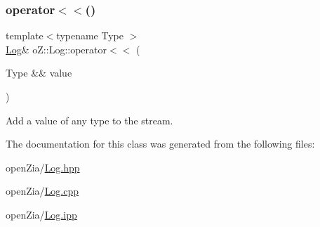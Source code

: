 \mbox{\label{classo_z_1_1_log_a0cb4c3c614b1d5ae6285aecb31554fb4}} 
\subsubsection{\texorpdfstring{operator$<$$<$()}{operator<<()}\hspace{0.1cm}{\footnotesize\ttfamily [2/2]}}
{\footnotesize\ttfamily template$<$typename Type $>$ \\
\mbox{\hyperlink{classo_z_1_1_log}{Log}}\& o\+Z\+::\+Log\+::operator$<$$<$ (\begin{DoxyParamCaption}\item[{Type \&\&}]{value }\end{DoxyParamCaption})}



Add a value of any type to the stream. 



The documentation for this class was generated from the following files\+:\begin{DoxyCompactItemize}
\item 
open\+Zia/\mbox{\hyperlink{_log_8hpp}{Log.\+hpp}}\item 
open\+Zia/\mbox{\hyperlink{_log_8cpp}{Log.\+cpp}}\item 
open\+Zia/\mbox{\hyperlink{_log_8ipp}{Log.\+ipp}}\end{DoxyCompactItemize}
